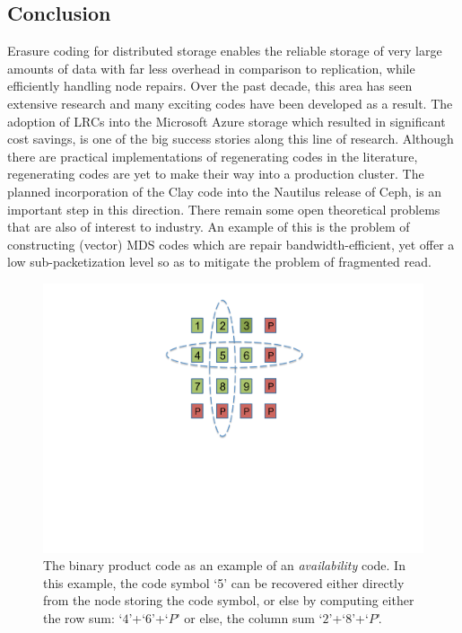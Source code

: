 \begin{multicols}{2}
\section{Conclusion}

Erasure coding for distributed storage enables the reliable storage of very large amounts of data with far less overhead in comparison to replication, while efficiently handling node repairs. Over the past decade, this area has seen extensive research and  many exciting codes have been developed as a result. The adoption of LRCs into the Microsoft Azure storage which resulted in significant cost savings, is one of the big success stories along this line of research. Although there are practical implementations of regenerating codes in the literature, regenerating codes are yet to make their way into a production cluster. The planned incorporation of the Clay code into the Nautilus release of Ceph, is an important step in this direction. There remain some open theoretical problems that are also of interest to industry. An example of this is the problem of constructing (vector) MDS codes which are repair bandwidth-efficient, yet offer a low sub-packetization level so as to mitigate the problem of fragmented read.
\end{multicols}


	\begin{figure}[H]
		\centering
		\includegraphics[scale=.47]{src/Figures/chap4/product_code}  
		\caption{The binary product code as an example of an {\em availability} code.  In this example, the code symbol `5' can be recovered either directly from the node storing the code symbol, or else by computing either the row sum: `$4$'+`$6$'+`$P$' or else, the column sum `$2$'+`$8$'+`$P$'.  }  \label{fig:product_code}    
	\end{figure}

